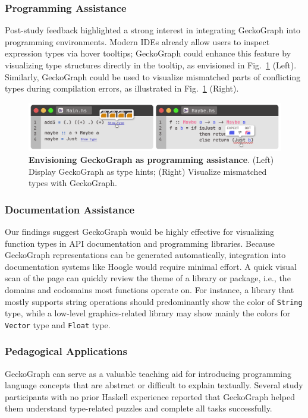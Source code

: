 \documentclass[preprint,12pt]{elsarticle}
\begin{document}
\subsubsection{Programming Assistance}
Post-study feedback highlighted a strong interest in integrating GeckoGraph into programming environments. 
Modern IDEs already allow users to inspect expression types via hover tooltips; GeckoGraph could enhance this feature by visualizing type structures directly in the tooltip, as envisioned in Fig.~\ref{fig:application} (Left). 
Similarly, GeckoGraph could be used to visualize mismatched parts of conflicting types during compilation errors, as illustrated in Fig.~\ref{fig:application} (Right).

\begin{figure}[]
  \includegraphics[width=\linewidth]{figures/Application.png}
  \caption{\label{fig:application} 
 {\bf Envisioning GeckoGraph as programming assistance}. (Left) Display GeckoGraph as type hints; (Right) Visualize mismatched types with GeckoGraph. }
\end{figure}


\subsubsection{Documentation Assistance}
Our findings suggest GeckoGraph would be highly effective for visualizing function types in API documentation and programming libraries. 
Because GeckoGraph representations can be generated automatically, integration into documentation systems like Hoogle \cite{Mitchell_undated-fb} would require minimal effort. 
A quick visual scan of the page can quickly review the theme of a library or package, i.e., the domains and codomains most functions operate on. For instance, a library that mostly supports string operations should predominantly show the color of {\tt String} type, while a low-level graphics-related library may show mainly the colors for {\tt Vector} type and {\tt Float} type.

\subsubsection{Pedagogical Applications}
GeckoGraph can serve as a valuable teaching aid for introducing programming language concepts that are abstract or difficult to explain textually. 
Several study participants with no prior Haskell experience reported that GeckoGraph helped them understand type-related puzzles and complete all tasks successfully. 
\end{document}
